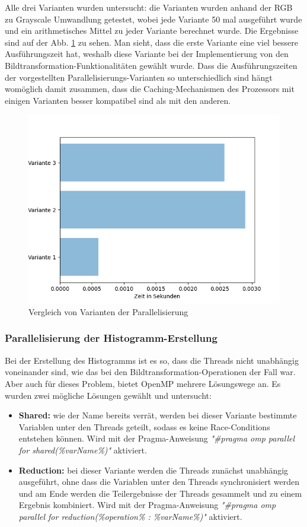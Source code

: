 \documentclass[11pt]{amsart}
\begin{document}
Alle drei Varianten wurden untersucht: die Varianten wurden anhand der RGB zu Grayscale Umwandlung getestet, wobei jede Variante 50 mal ausgeführt wurde und ein arithmetisches Mittel zu jeder Variante berechnet wurde. Die Ergebnisse sind auf der Abb. \ref{fig:testFor} zu sehen. Man sieht, dass die erste Variante eine viel bessere Ausführungszeit hat, weshalb diese Variante bei der Implementierung von den Bildtransformation-Funktionalitäten gewählt wurde. Dass die Ausführungszeiten der vorgestellten Parallelisierungs-Varianten so unterschiedlich sind hängt womöglich damit zusammen, dass die Caching-Mechanismen des Prozessors mit einigen Varianten besser kompatibel sind als mit den anderen.

 \begin{figure}
\includegraphics[scale=0.6]{images/testFor.png}
\caption{Vergleich von Varianten der Parallelisierung}
\label{fig:testFor}
\end{figure}


\subsubsection{Parallelisierung der Histogramm-Erstellung} \label{sec:evalHist}
Bei der Erstellung des Histogramms ist es so, dass die Threads nicht unabhängig voneinander sind, wie das bei den Bildtransformation-Operationen der Fall war. Aber auch für dieses Problem, bietet OpenMP mehrere Lösungswege an. Es wurden zwei mögliche Lösungen gewählt und untersucht:

\begin{itemize}
\item \textbf{Shared:} wie der Name bereits verrät, werden bei dieser Variante bestimmte Variablen unter den Threads geteilt, sodass es keine Race-Conditions entstehen können. Wird mit der Pragma-Anweisung \textit{"\#pragma omp parallel for shared(\%varName\%)"} aktiviert.
\item \textbf{Reduction:} bei dieser Variante werden die Threads zunächst unabhängig ausgeführt, ohne dass die Variablen unter den Threads synchronisiert werden und am Ende werden die Teilergebnisse der Threads gesammelt und zu einem Ergebnis kombiniert. Wird mit der Pragma-Anweisung \textit{"\#pragma omp parallel for reduction(\%operation\% : \%varName\%)"} aktiviert.
\end{itemize}
\end{document}
